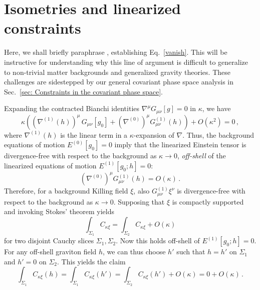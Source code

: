 \documentclass[]{jkpaper}
\theoremstyle{plain}
\theoremstyle{definition}
\begin{document}
\appendix


\section{Isometries and linearized constraints}\label{app_isolin}

Here, we shall briefly paraphrase \cite[Lemmas 1.1 \& 1.5]{fischer1980structure}, establishing Eq.~\eqref{vanish}. This will be instructive for understanding why this line of argument is difficult to generalize to non-trivial matter backgrounds and generalized gravity theories. These challenges are sidestepped by our general covariant phase space analysis in Sec.~\ref{sec: Constraints in the covariant phase space}.

Expanding the contracted Bianchi identities $\nabla^\mu G_{\mu \nu}[g]=0$ in $\kappa$, we have
\begin{equation}\label{A1}
\kappa\left(\left(\nabla^{(1)}(h)\right)^\mu\,G_{\mu \nu}[g_0] +(\nabla^{(0)})^\mu G^{(1)}_{\mu \nu}(h)\right)+O(\kappa^2)=0\,,
\end{equation}
where $\nabla^{(1)}(h)$ is the linear term in a $\kappa$-expansion of $\nabla$.  Thus, the background equations of motion $E^{(0)}[g_0]=0$ imply that the linearized Einstein tensor is divergence-free with respect to the background as $\kappa\to0$, \emph{off-shell} of the linearized equations of motion $E^{(1)}[g_0;h]=0$:
\begin{equation}\label{A2}
   (\nabla^{(0)})^\mu G^{(1)}_{\mu \nu}(h) =O(\kappa)\,.
\end{equation}
Therefore, for a background Killing field $\xi$, also $G_{\mu \nu}^{(1)}\xi^\nu$ is divergence-free with respect to the background as $\kappa\to0$. Supposing that $\xi$ is compactly supported and invoking Stokes' theorem yields
\begin{equation}
    \int_{\Sigma_1}C_{\kappa\xi}=\int_{\Sigma_2}C_{\kappa\xi}+O(\kappa)
\end{equation}
for two disjoint Cauchy slices $\Sigma_1,\Sigma_2$. Now this holds off-shell of $E^{(1)}[g_0;h]=0$. For any off-shell graviton field $h$, we can thus choose $h'$ such that $h=h'$ on $\Sigma_1$ and  $h'=0$ on $\Sigma_2$. This yields the claim
\begin{equation}
    \int_{\Sigma_1}C_{\kappa\xi}(h)=\int_{\Sigma_1}C_{\kappa\xi}(h')=\int_{\Sigma_2}C_{\kappa\xi}(h')+O(\kappa)=0+O(\kappa)\,.
\end{equation}
\end{document}

